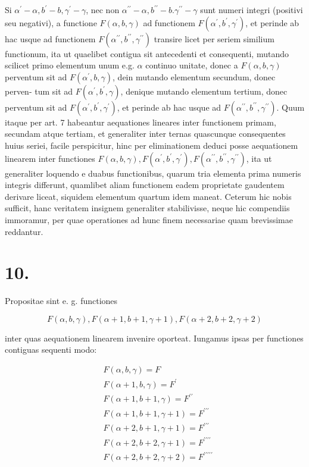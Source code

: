 \documentclass[10pt]{article}
\begin{document}
Si \(\alpha^{\prime}-\alpha, b^{\prime}-b, \gamma^{\prime}-\gamma\), nec non \(\alpha^{\prime \prime}-\alpha, b^{\prime \prime}-b . \gamma^{\prime \prime}-\gamma\) sunt numeri integri (positivi seu negativi), a functione \(F(\alpha, b, \gamma)\) ad functionem \(F\left(\alpha^{\prime}, b^{\prime}, \gamma^{\prime}\right)\), et perinde ab hac usque ad functionem \(F\left(\alpha^{\prime \prime}, b^{\prime \prime}, \gamma^{\prime \prime}\right)\) transire licet per seriem similium functionum, ita ut quaelibet contigua sit antecedenti et consequenti, mutando scilicet primo elementum unum e.g. \(\alpha\) continuo unitate, donec a \(F(\alpha, b, \gamma)\) perventum sit ad \(F\left(\alpha^{\prime}, b, \gamma\right)\), dein mutando elementum secundum, donec perven-
tum sit ad \(F\left(\alpha^{\prime}, b^{\prime}, \gamma\right)\), denique mutando elementum tertium, donec perventum sit ad \(F\left(\alpha^{\prime}, b^{\prime}, \gamma^{\prime}\right)\), et perinde ab hac usque ad \(F\left(\alpha^{\prime \prime}, b^{\prime \prime}, \gamma^{\prime \prime}\right)\). Quum itaque per art. 7 habeantur aequationes lineares inter functionem primam, secundam atque tertiam, et generaliter inter ternas quascunque consequentes huius seriei, facile perspicitur, hinc per eliminationem deduci posse aequationem linearem inter functiones \(F(\alpha, b, \gamma), F\left(\alpha^{\prime}, b^{\prime}, \gamma^{\prime}\right), F\left(\alpha^{\prime \prime}, b^{\prime \prime}, \gamma^{\prime \prime}\right)\), ita ut generaliter loquendo e duabus functionibus, quarum tria elementa prima numeris integris differunt, quamlibet aliam functionem eadem proprietate gaudentem derivare liceat, siquidem elementum quartum idem maneat. Ceterum hic nobis sufficit, hanc veritatem insignem generaliter stabilivisse, neque hic compendiis immoramur, per quae operationes ad hunc finem necessariae quam brevissimae reddantur.

\section*{10.}
Propositae sint e. g. functiones

\[
F(\alpha, b, \gamma), F(\alpha+1, b+1, \gamma+1), F(\alpha+2, b+2, \gamma+2)
\]

inter quas aequationem linearem invenire oporteat. Iungamus ipsas per functiones contiguas sequenti modo:

\[
\begin{aligned}
& F(\alpha, b, \gamma)=F \\
& F(\alpha+1, b, \gamma)=F^{\prime} \\
& F(\alpha+1, b+1, \gamma)=F^{\prime \prime} \\
& F(\alpha+1, b+1, \gamma+1)=F^{\prime \prime \prime} \\
& F(\alpha+2, b+1, \gamma+1)=F^{\prime \prime \prime} \\
& F(\alpha+2, b+2, \gamma+1)=F^{\prime \prime \prime \prime} \\
& F(\alpha+2, b+2, \gamma+2)=F^{\prime \prime \prime \prime \prime}
\end{aligned}
\]
\end{document}
